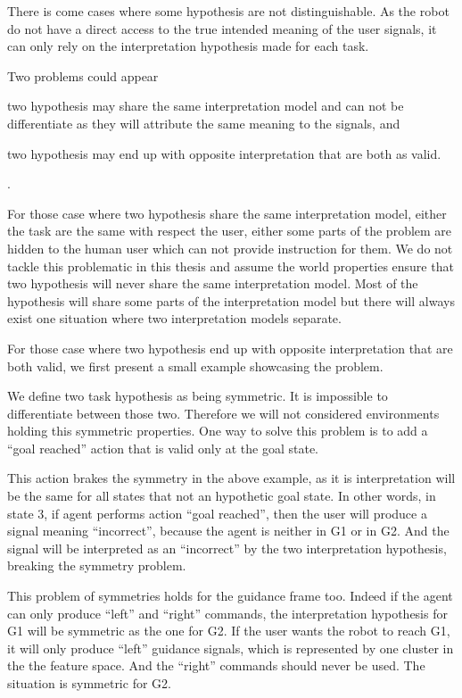 There is come cases where some hypothesis are not distinguishable. As the robot do not have a direct access to the true intended meaning of the user signals, it can only rely on the interpretation hypothesis made for each task.

Two problems could appear \begin{inparaenum}[a)] \item two hypothesis may share the same interpretation model and can not be differentiate as they will attribute the same meaning to the signals, and \item two hypothesis may end up with opposite interpretation that are both as valid. \end{inparaenum}.

For those case where two hypothesis share the same interpretation model, either the task are the same with respect the user, either some parts of the problem are hidden to the human user which can not provide instruction for them. We do not tackle this problematic in this thesis and assume the world properties ensure that two hypothesis will never share the same interpretation model. Most of the hypothesis will share some parts of the interpretation model but there will always exist one situation where two interpretation models separate.

For those case where two hypothesis end up with opposite interpretation that are both valid, we first present a small example showcasing the problem.


We define two task hypothesis as being symmetric. It is impossible to differentiate between those two. Therefore we will not considered environments holding this symmetric properties. One way to solve this problem is to add a ``goal reached'' action that is valid only at the goal state. 

This action brakes the symmetry in the above example, as it is interpretation will be the same for all states that not an hypothetic goal state. In other words, in state 3, if agent performs action ``goal reached'', then the user will produce a signal meaning ``incorrect'', because the agent is neither in G1 or in G2. And the signal will be interpreted as an ``incorrect'' by the two interpretation hypothesis, breaking the symmetry problem.


This problem of symmetries holds for the guidance frame too. Indeed if the agent can only produce ``left'' and ``right'' commands, the interpretation hypothesis for G1 will be symmetric as the one for G2. If the user wants the robot to reach G1, it will only produce ``left'' guidance signals, which is represented by one cluster in the the feature space. And the ``right'' commands should never be used. The situation is symmetric for G2.

